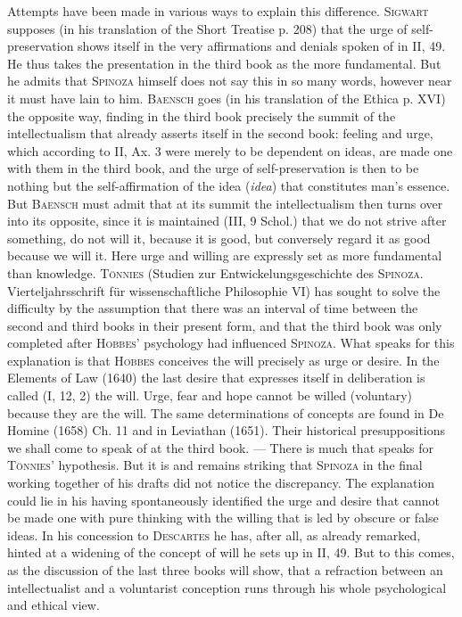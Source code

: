 \documentclass[12pt]{article}
\newcommand{\opage}[1]{\marginnote{\footnotesize\textit{[#1]}}}
\begin{document}
Attempts have been made in various ways to explain this difference. \textsc{Sigwart}
supposes (in his translation of the Short Treatise p. 208) that the urge of
self-preservation shows itself in the very affirmations and denials spoken of in II, 49. He
thus takes the presentation in the third book as the more fundamental. But he admits that
\textsc{Spinoza} himself does not say this in so many words, however near it must have lain to
him. \textsc{Baensch} goes (in his translation of the Ethica p. XVI) the opposite way, finding
in the third book precisely the summit of the intellectualism that already asserts itself in
the second book: feeling and urge, which according to II, Ax. 3 were merely to be dependent on
ideas, are made one with them in the third book, and the urge of self-preservation is then to
be nothing but the self-affirmation of the idea (\textit{idea}) that constitutes man's
essence. But \textsc{Baensch} must admit that at its summit the intellectualism then turns
over into its opposite, since it is maintained (III, 9 Schol.) that we do not strive after
something, do not will it, because it is good, but conversely regard it as good because we
will it. Here urge and willing are expressly set as more fundamental than knowledge.
\textsc{Tönnies} (Studien zur Entwickelungsgeschichte des \textsc{Spinoza}.
Vierteljahrsschrift für wissenschaftliche Philosophie VI) has sought to solve the difficulty
by the assumption that there was an interval of time between the second and third books in
their present form, and that the third book was only completed after \textsc{Hobbes}'
psychology had influenced \textsc{Spinoza}. What speaks for this explanation is that
\textsc{Hobbes} conceives the will precisely as urge or desire. In the Elements of Law (1640)
the last desire that expresses itself in deliberation is called (I, 12, 2) the will. Urge,
fear and hope cannot be willed (voluntary) \opage{57}because they are the will. The same
determinations of concepts are found in De Homine (1658) Ch. 11 and in Leviathan (1651).
Their historical presuppositions we shall come to speak of at the third book. --- There is
much that speaks for \textsc{Tönnies}' hypothesis. But it is and remains striking that
\textsc{Spinoza} in the final working together of his drafts did not notice the discrepancy.
The explanation could lie in his having spontaneously identified the urge and desire that
cannot be made one with pure thinking with the willing that is led by obscure or false
ideas. In his concession to \textsc{Descartes} he has, after all, as already remarked,
hinted at a widening of the concept of will he sets up in II, 49. But to this comes, as the
discussion of the last three books will show, that a refraction between an intellectualist
and a voluntarist conception runs through his whole psychological and ethical view.
\end{document}
